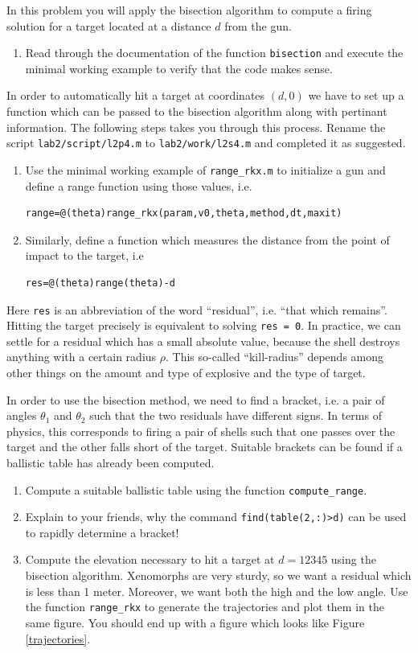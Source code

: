 \documentclass[a4paper,12pt]{article}
\newcounter{problem}
\newenvironment{problem}{\refstepcounter{problem} \noindent {\bf Problem \arabic{problem}}}{\newpage}
\begin{document}
\begin{problem} In this problem you will apply the bisection algorithm to compute a firing solution for a target located at a distance $d$ from the gun. 
\begin{enumerate}
\item Read through the documentation of the function {\tt bisection} and execute the minimal working example to verify that the code makes sense. 
\end{enumerate}
In order to automatically hit a target at coordinates $(d,0)$ we have to set up a function which can be passed to the bisection algorithm along with pertinant information. The following steps takes you through this process. Rename the script {\tt lab2/script/l2p4.m} to {\tt lab2/work/l2s4.m} and completed it as suggested.
\begin{enumerate}[resume]
\item Use the minimal working example of {\tt range\_rkx.m} to initialize a gun and define a range function using those values, i.e.
\begin{verbatim}
range=@(theta)range_rkx(param,v0,theta,method,dt,maxit)
\end{verbatim}
\item Similarly, define a function which measures the distance from the point of impact to the target, i.e
\begin{verbatim}
res=@(theta)range(theta)-d
\end{verbatim} 
\end{enumerate} 
Here {\tt res} is an abbreviation of the word ``residual'', i.e. ``that which remains''. Hitting the target precisely is equivalent to solving {\tt res = 0}. In practice, we can settle for a residual which has a small absolute value, because the shell destroys anything with a certain radius $\rho$. This so-called ``kill-radius'' depends among other things on the amount and type of explosive and the type of target.

In order to use the bisection method, we need to find a bracket, i.e. a pair of angles $\theta_1$ and $\theta_2$ such that the two residuals have different signs. In terms of physics, this corresponds to firing a pair of shells such that one passes over the target and the other falls short of the target. Suitable brackets can be found if a ballistic table has already been computed.
\begin{enumerate}[resume]
\item Compute a suitable ballistic table using the function {\tt compute\_range}.
\item Explain to your friends, why the command {\tt find(table(2,:)>d)} can be used to rapidly determine a bracket!
\item Compute the elevation necessary to hit a target at $d = 12345$ using the bisection algorithm. Xenomorphs are very sturdy, so we want a residual which is less than 1 meter. Moreover, we want both the high and the low angle. Use the function {\tt range\_rkx} to generate the trajectories and plot them in the same figure. You should end up with a figure which looks like Figure \ref{trajectories}.


\end{enumerate}
\end{problem}
\end{document}
